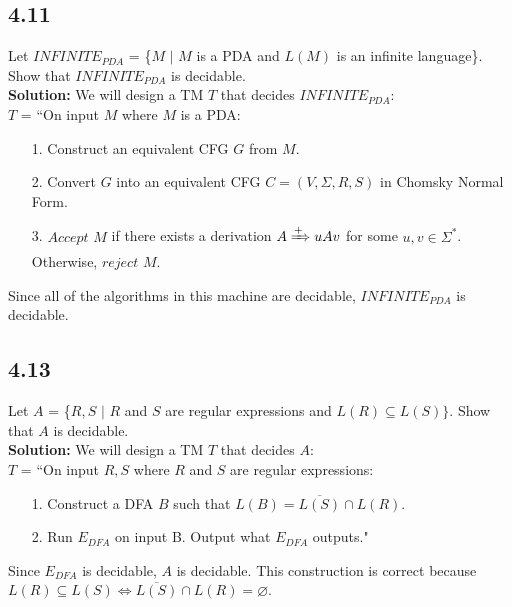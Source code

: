 \subsection*{4.11} Let $INFINITE_{PDA}$ = \{\textlangle{}$M$\textrangle{} $|$ $M$ is a PDA and $L(M)$ is an infinite language\}. Show that $INFINITE_{PDA}$ is decidable.
\\
\textbf{Solution:} We will design a TM $T$ that decides $INFINITE_{PDA}$:
\\
$T$ = ``On input \textlangle{}$M$\textrangle{} where $M$ is a PDA:
\begin{enumerate}
\itemsep0em
\item[1.]Construct an equivalent CFG $G$ from $M$.
\item[2.]Convert $G$ into an equivalent CFG $C = (V, \Sigma, R, S)$ in Chomsky Normal Form.
\item[3.]$Accept$ \textlangle{}$M$\textrangle{} if there exists a derivation $A \xRightarrow{+} uAv$ for some $u, v \in \Sigma^*$. Otherwise, $reject$ \textlangle{}$M$\textrangle{}.
\end{enumerate}
Since all of the algorithms in this machine are decidable, $INFINITE_{PDA}$ is decidable.

\subsection*{4.13} Let $A$ = \{\textlangle{}$R,S$\textrangle{} $|$ $R$ and $S$ are regular expressions and $L(R) \subseteq L(S)\}$. Show that $A$ is decidable.
\\
\textbf{Solution:} We will design a TM $T$ that decides $A$:
\\
$T$ = ``On input \textlangle{}$R,S$\textrangle{} where $R$ and $S$ are regular expressions:
\begin{enumerate}
\itemsep0em
\item[1.]Construct a DFA $B$ such that $L(B) = \overline{L(S)} \cap L(R)$.
\item[2.]Run $E_{DFA}$ on input \textlangle{}B\textrangle{}. Output what $E_{DFA}$ outputs."
\end{enumerate}
Since $E_{DFA}$ is decidable, $A$ is decidable. This construction is correct because $L(R) \subseteq L(S) \Leftrightarrow \overline{L(S)} \cap L(R) = \varnothing$.

